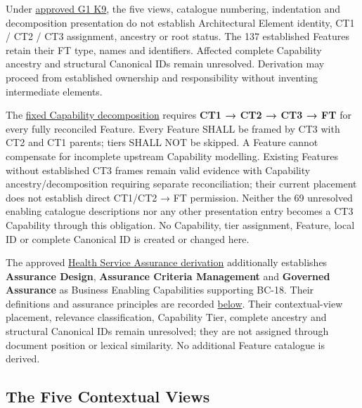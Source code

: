 Under \hyperref[rad:k9:1392]{approved G1 K9}, the five views, catalogue numbering, indentation and decomposition presentation do not establish Architectural Element identity, CT1 /\allowbreak{} CT2 /\allowbreak{} CT3 assignment, ancestry or root status. The 137 established Features retain their FT type, names and identifiers. Affected complete Capability ancestry and structural Canonical IDs remain unresolved. Derivation may proceed from established ownership and responsibility without inventing intermediate elements.

\label{rad:enabling:18}

The \hyperref[rad:metamodel:33]{fixed Capability decomposition} requires \textbf{CT1 → CT2 → CT3 → FT} for every fully reconciled Feature. Every Feature SHALL be framed by CT3 with CT2 and CT1 parents; tiers SHALL NOT be skipped. A Feature cannot compensate for incomplete upstream Capability modelling. Existing Features without established CT3 frames remain valid evidence with Capability ancestry/\allowbreak{}decomposition requiring separate reconciliation; their current placement does not establish direct CT1/\allowbreak{}CT2 → FT permission. Neither the 69 unresolved enabling catalogue descriptions nor any other presentation entry becomes a CT3 Capability through this obligation. No Capability, tier assignment, Feature, local ID or complete Canonical ID is created or changed here.

\label{rad:enabling:20}

The approved \hyperref[rad:assurance-strategy]{Health Service Assurance derivation} additionally establishes \textbf{Assurance Design}, \textbf{Assurance Criteria Management} and \textbf{Governed Assurance} as Business Enabling Capabilities supporting BC-18. Their definitions and assurance principles are recorded \hyperref[rad:enabling:674]{below}. Their contextual-view placement, relevance classification, Capability Tier, complete ancestry and structural Canonical IDs remain unresolved; they are not assigned through document position or lexical similarity. No additional Feature catalogue is derived.

\label{rad:enabling:22}

\par\smallskip
{}\label{rad:enabling:24}
\subsection*{The Five Contextual Views}
\label{rad:enabling:26}

